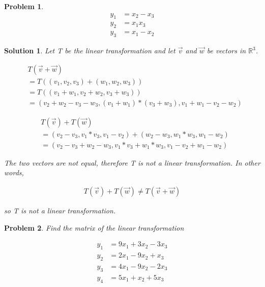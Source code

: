\documentclass{article}
\newtheorem{problem}{Problem}
\newtheorem*{solution}{Solution}
\begin{document}
\begin{problem}

\begin{align*}
y_{1} &= x_{2} - x_{3} \\
y_{2} &= x_{1} x_{3}  \\
y_{3} &= x_{1} - x_{2}
\end{align*}

\end{problem}

\begin{solution}
Let T be the linear transformation and let $\vec{v}$ and $\vec{w}$ be vectors in $\mathbb{R}^3$.

\begin{align*}
& T(\vec{v} + \vec{w}) \\
&= T((v_{1}, v_{2}, v_{3}) + (w_{1}, w_{2}, w_{3})) \\ 
&= T((v_{1} + w_{1}, v_{2} + w_{2}, v_{3} + w_{3})) \\
&= (v_{2} + w_{2} - v_{3} - w_{3}, (v_{1} + w_{1}) * (v_{3} + w_{3}), v_{1} + w_{1} - v_{2} - w_{2}) 
\end{align*}

\begin{align*}
& T(\vec{v}) + T(\vec{w}) \\
&= (v_{2} - v_{3}, v_{1} * v_{3}, v_{1} - v_{2}) + (w_{2} - w_{3}, w_{1} * w_{3}, w_{1} - w_{2}) \\
&= (v_{2} - v_{3} + w_{2} - w_{3}, v_{1} * v_{3} + w_{1} * w_{3}, v_{1} - v_{2} + w_{1} - w_{2}) 
\end{align*}

The two vectors are not equal, therefore T is not a linear transformation. In other words,

\begin{align*}
T(\vec{v}) + T(\vec{w}) \neq T(\vec{v} + \vec{w})
\end{align*}

so T is not a linear transformation.
\end{solution}

\begin{problem}

Find the matrix of the linear transformation

\begin{align*}
y_{1} &= 9x_{1} + 3x_{2} - 3x_{3} \\
y_{2} &= 2x_{1} - 9x_{2} + x_{3} \\
y_{3} &= 4x_{1} - 9x_{2} - 2x_{3} \\ 
y_{4} &= 5x_{1} + x_{2} + 5x_{3}
\end{align*}

\end{problem}
\end{document}
